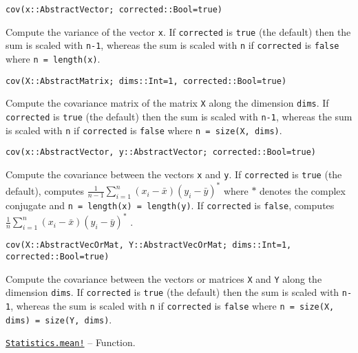 \begin{adjustwidth}{2em}{0pt}


\begin{verbatim}
cov(x::AbstractVector; corrected::Bool=true)
\end{verbatim}

Compute the variance of the vector \texttt{x}. If \texttt{corrected} is \texttt{true} (the default) then the sum is scaled with \texttt{n-1}, whereas the sum is scaled with \texttt{n} if \texttt{corrected} is \texttt{false} where \texttt{n = length(x)}.




\begin{lstlisting}
cov(X::AbstractMatrix; dims::Int=1, corrected::Bool=true)
\end{lstlisting}

Compute the covariance matrix of the matrix \texttt{X} along the dimension \texttt{dims}. If \texttt{corrected} is \texttt{true} (the default) then the sum is scaled with \texttt{n-1}, whereas the sum is scaled with \texttt{n} if \texttt{corrected} is \texttt{false} where \texttt{n = size(X, dims)}.




\begin{lstlisting}
cov(x::AbstractVector, y::AbstractVector; corrected::Bool=true)
\end{lstlisting}

Compute the covariance between the vectors \texttt{x} and \texttt{y}. If \texttt{corrected} is \texttt{true} (the default), computes  \(\frac{1}{n-1}\sum_{i=1}^n (x_i-\bar x) (y_i-\bar y)^*\)  where  \(*\)  denotes the complex conjugate and \texttt{n = length(x) = length(y)}. If \texttt{corrected} is \texttt{false}, computes  \(\frac{1}{n}\sum_{i=1}^n (x_i-\bar x) (y_i-\bar y)^*\) .




\begin{lstlisting}
cov(X::AbstractVecOrMat, Y::AbstractVecOrMat; dims::Int=1, corrected::Bool=true)
\end{lstlisting}

Compute the covariance between the vectors or matrices \texttt{X} and \texttt{Y} along the dimension \texttt{dims}. If \texttt{corrected} is \texttt{true} (the default) then the sum is scaled with \texttt{n-1}, whereas the sum is scaled with \texttt{n} if \texttt{corrected} is \texttt{false} where \texttt{n = size(X, dims) = size(Y, dims)}.



\end{adjustwidth}
\hypertarget{9852865620009351869}{} 
\hyperlink{9852865620009351869}{\texttt{Statistics.mean!}}  -- {Function.}

